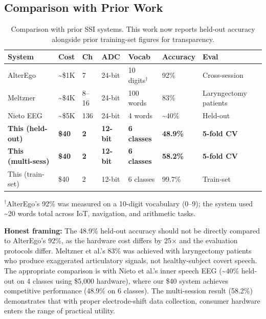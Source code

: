 \documentclass[11pt, a4paper]{article}
\begin{document}
\subsection{Comparison with Prior Work}

\begin{table}[h]
\centering
\caption{Comparison with prior SSI systems. This work now reports held-out accuracy alongside prior training-set figures for transparency.}
\label{tab:comparison}
\begin{tabular}{@{}lllllll@{}}
\toprule
System & Cost & Ch & ADC & Vocab & Accuracy & Eval \\
\midrule
AlterEgo~\cite{kapur2018} & \textasciitilde\$1K & 7 & 24-bit & 10 digits$^\dagger$ & 92\% & Cross-session \\
Meltzner~\cite{meltzner2017} & \textasciitilde\$4K & 8--16 & 24-bit & 100 words & 83\% & Laryngectomy patients \\
Nieto EEG~\cite{nieto2022} & \textasciitilde\$5K & 136 & 24-bit & 4 words & \textasciitilde40\% & Held-out \\
\textbf{This (held-out)} & \textbf{\$40} & \textbf{2} & \textbf{12-bit} & \textbf{6 classes} & \textbf{48.9\%} & \textbf{5-fold CV} \\
\textbf{This (multi-sess)} & \textbf{\$40} & \textbf{2} & \textbf{12-bit} & \textbf{6 classes} & \textbf{58.2\%} & \textbf{5-fold CV} \\
This (train-set) & \$40 & 2 & 12-bit & 6 classes & 99.7\% & Train-set \\
\bottomrule
\end{tabular}
\end{table}

$^\dagger$AlterEgo's 92\% was measured on a 10-digit vocabulary (0--9); the system used \textasciitilde20 words total across IoT, navigation, and arithmetic tasks.

\textbf{Honest framing:} The 48.9\% held-out accuracy should not be directly compared to AlterEgo's 92\%, as the hardware cost differs by 25$\times$ and the evaluation protocols differ. Meltzner et al.'s 83\% was achieved with laryngectomy patients who produce exaggerated articulatory signals, not healthy-subject covert speech. The appropriate comparison is with Nieto et al.'s inner speech EEG (\textasciitilde40\% held-out on 4 classes using \$5,000 hardware), where our \$40 system achieves competitive performance (48.9\% on 6 classes). The multi-session result (58.2\%) demonstrates that with proper electrode-shift data collection, consumer hardware enters the range of practical utility.
\end{document}
